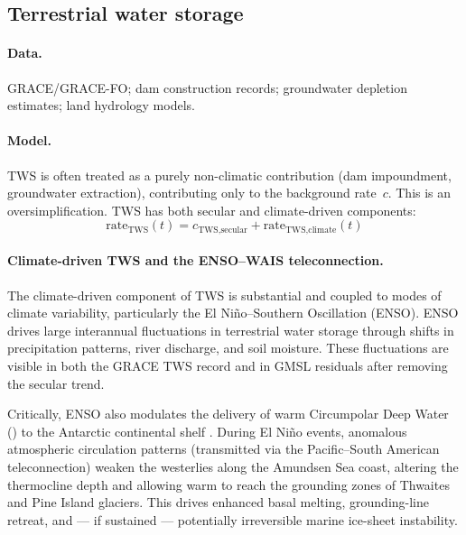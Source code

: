 \documentclass[11pt]{article}
\newcommand{\CDW}{\text{CDW}}
\begin{document}
\subsection{Terrestrial water storage}
\label{sec:tws}

\paragraph{Data.}  GRACE/GRACE-FO; dam construction records; groundwater depletion estimates; land hydrology models.

\paragraph{Model.}  TWS is often treated as a purely non-climatic contribution (dam impoundment, groundwater extraction), contributing only to the background rate~$c$.  This is an oversimplification.  TWS has both secular and climate-driven components:
\begin{equation}
  \text{rate}_{\text{TWS}}(t) = c_{\text{TWS,secular}} + \text{rate}_{\text{TWS,climate}}(t)
  \label{eq:tws}
\end{equation}

\paragraph{Climate-driven TWS and the ENSO--WAIS teleconnection.}

The climate-driven component of TWS is substantial and coupled to modes of climate variability, particularly the El Ni\~no--Southern Oscillation (ENSO).  ENSO drives large interannual fluctuations in terrestrial water storage through shifts in precipitation patterns, river discharge, and soil moisture.  These fluctuations are visible in both the GRACE TWS record and in GMSL residuals after removing the secular trend.

Critically, ENSO also modulates the delivery of warm Circumpolar Deep Water (\CDW) to the Antarctic continental shelf \citep{steig2012tropical, paolo2018response}.  During El Ni\~no events, anomalous atmospheric circulation patterns (transmitted via the Pacific--South American teleconnection) weaken the westerlies along the Amundsen Sea coast, altering the thermocline depth and allowing warm \CDW{} to reach the grounding zones of Thwaites and Pine Island glaciers.  This drives enhanced basal melting, grounding-line retreat, and --- if sustained --- potentially irreversible marine ice-sheet instability.
\end{document}
